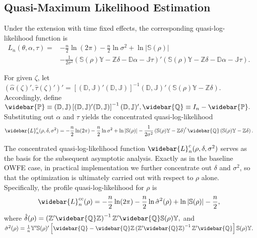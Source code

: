 \documentclass[11pt,a4paper]{article}
\begin{document}
\subsection{Quasi-Maximum Likelihood Estimation}

Under the extension with time fixed effects, the corresponding quasi-log-likelihood function is
\begin{align*}
L_n(\theta,\alpha,\tau)
=
&-\frac{n}{2}\ln(2\pi)
-\frac{n}{2}\ln\sigma^2
+\ln|\mathbb{S}(\rho)| \\
&-\frac{1}{2\sigma^2}
\left(
\mathbb{S}(\rho)\mathbb{Y}
-
\mathbb{Z}\delta
-
\mathbb{D}\alpha
-
\mathbb{J}\tau
\right)'
\left(
\mathbb{S}(\rho)\mathbb{Y}
-
\mathbb{Z}\delta
-
\mathbb{D}\alpha
-
\mathbb{J}\tau
\right).
\end{align*}

For given $\zeta$, let
$
(\hat{\alpha}(\zeta)',\hat{\tau}(\zeta)')'
=
\left[
(\mathbb{D},\mathbb{J})'(\mathbb{D},\mathbb{J})
\right]^{-1}
(\mathbb{D},\mathbb{J})'
\left(
\mathbb{S}(\rho)\mathbb{Y}
-
\mathbb{Z}\delta
\right).
$
Accordingly, define
$
\widebar{\mathbb{P}}
\equiv
(\mathbb{D},\mathbb{J})
\left[
(\mathbb{D},\mathbb{J})'(\mathbb{D},\mathbb{J})
\right]^{-1}
(\mathbb{D},\mathbb{J})',
\widebar{\mathbb{Q}}
\equiv
I_n-\widebar{\mathbb{P}}.
$
Substituting out $\alpha$ and $\tau$ yields the concentrated quasi-log-likelihood
\begin{align*}
\widebar{L}_n^c(\rho,\delta,\sigma^2)
=
-\frac{n}{2}\ln(2\pi)
-\frac{n}{2}\ln\sigma^2
+\ln|\mathbb{S}(\rho)|-\frac{1}{2\sigma^2}
\left(
\mathbb{S}(\rho)\mathbb{Y}
-
\mathbb{Z}\delta
\right)'
\widebar{\mathbb{Q}}
\left(
\mathbb{S}(\rho)\mathbb{Y}
-
\mathbb{Z}\delta
\right).
\end{align*}


The concentrated quasi-log-likelihood function $\widebar{L}_n^c(\rho,\delta,\sigma^2)$ serves as the basis for the subsequent asymptotic analysis. Exactly as in the baseline OWFE case, in practical implementation we further concentrate out $\delta$ and $\sigma^2$, so that the optimization is ultimately carried out with respect to $\rho$ alone. Specifically, the profile quasi-log-likelihood for $\rho$ is
$$
\widebar{L}_n^{cc}(\rho)
=
-\frac{n}{2}\ln(2\pi)
-\frac{n}{2}\ln\hat{\sigma}^2(\rho)
+\ln|\mathbb{S}(\rho)|
-\frac{n}{2},
$$
where
$
\hat{\delta}(\rho)
=
\left(
\mathbb{Z}'\widebar{\mathbb{Q}}\mathbb{Z}
\right)^{-1}
\mathbb{Z}'\widebar{\mathbb{Q}}\mathbb{S}(\rho)\mathbb{Y},
$
and $
\hat{\sigma}^2(\rho)
=
\frac{1}{n}
\mathbb{Y}'\mathbb{S}(\rho)'
\left[
\widebar{\mathbb{Q}}
-
\widebar{\mathbb{Q}}\mathbb{Z}
\left(
\mathbb{Z}'\widebar{\mathbb{Q}}\mathbb{Z}
\right)^{-1}
\mathbb{Z}'\widebar{\mathbb{Q}}
\right]
\mathbb{S}(\rho)\mathbb{Y}.
$
\end{document}
